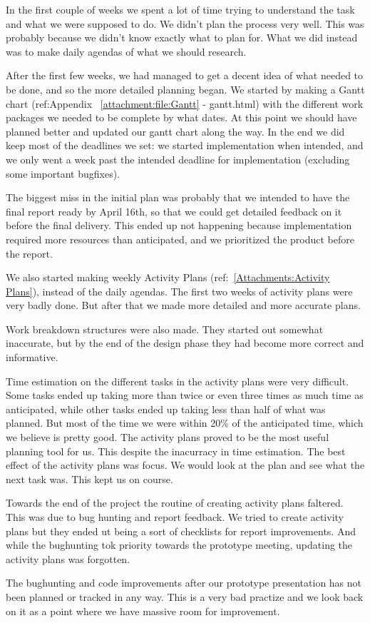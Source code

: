 In the first couple of weeks we spent a lot of time trying to understand the task and what we were supposed to do. We didn't plan the process very well. This was probably because we didn't know exactly what to plan for. What we did instead was to make daily agendas of what we should research.

After the first few weeks, we had managed to get a decent idea of what needed to be done, and so the more detailed planning began. We started by making a Gantt chart (ref:Appendix ~\ref{attachment:file:Gantt} - gantt.html) with the different work packages we needed to be complete by what dates. At this point we should have planned better and updated our gantt chart along the way. In the end we did keep most of the deadlines we set: we started implementation when intended, and we only went a week past the intended deadline for implementation (excluding some important bugfixes). 

The biggest miss in the initial plan was probably that we intended to have the final report ready by April 16th, so that we could get detailed feedback on it before the final delivery. This ended up not happening because implementation required more resources than anticipated, and we prioritized the product before the report.

We also started making weekly Activity Plans (ref:~\ref{Attachments:Activity Plans}), instead of the daily agendas. The first two weeks of activity plans were very badly done. But after that we made more detailed and more accurate plans.

Work breakdown structures were also made. They started out somewhat inaccurate, but by the end of the design phase they had become more correct and informative. 

Time estimation on the different tasks in the activity plans were very difficult. Some tasks ended up taking more than twice or even three times as much time as anticipated, while other tasks ended up taking less than half of what was planned. But most of the time we were within 20\% of the anticipated time, which we believe is pretty good. The activity plans proved to be the most useful planning tool for us. This despite the inacurracy in time estimation. The best effect of the activity plans was focus. We would look at the plan and see what the next task was. This kept us on course. 

Towards the end of the project the routine of creating activity plans faltered. This was due to bug hunting and report feedback. We tried to create activity plans but they ended ut being a sort of checklists for report improvements. And while the bughunting tok priority towards the prototype meeting, updating the activity plans was forgotten.
    
The bughunting and code improvements after our prototype presentation has not been planned or tracked in any way. This is a very bad practize and we look back on it as a point where we have massive room for improvement.

